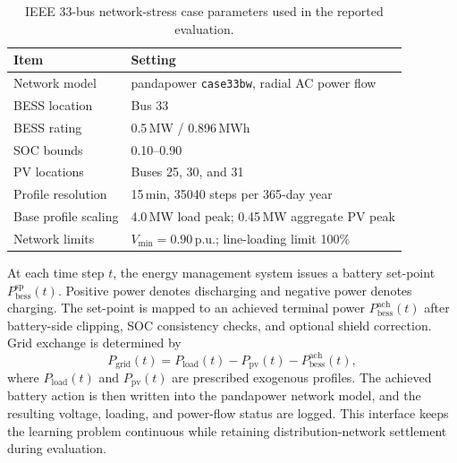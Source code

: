 \begin{table}[!t]
\centering
\footnotesize
\setlength{\tabcolsep}{4pt}
\renewcommand{\arraystretch}{1.08}
\caption{IEEE 33-bus network-stress case parameters used in the reported evaluation.}
\label{tab:ieee33_case_parameters}
\begin{tabularx}{\columnwidth}{lX}
\toprule
Item & Setting \\
\midrule
Network model & pandapower \texttt{case33bw}, radial AC power flow \\
BESS location & Bus 33 \\
BESS rating & 0.5\,MW / 0.896\,MWh \\
SOC bounds & 0.10--0.90 \\
PV locations & Buses 25, 30, and 31 \\
Profile resolution & 15\,min, 35040 steps per 365-day year \\
Base profile scaling & 4.0\,MW load peak; 0.45\,MW aggregate PV peak \\
Network limits & $V_{\min}=0.90$\,p.u.; line-loading limit 100\% \\
\bottomrule
\end{tabularx}
\end{table}

At each time step $t$, the energy management system issues a battery set-point $P_{\mathrm{bess}}^{\mathrm{sp}}(t)$. Positive power denotes discharging and negative power denotes charging. The set-point is mapped to an achieved terminal power $P_{\mathrm{bess}}^{\mathrm{ach}}(t)$ after battery-side clipping, SOC consistency checks, and optional shield correction. Grid exchange is determined by
\begin{equation}
P_{\mathrm{grid}}(t)=P_{\mathrm{load}}(t)-P_{\mathrm{pv}}(t)-P_{\mathrm{bess}}^{\mathrm{ach}}(t),
\label{eq:grid_balance_morphology}
\end{equation}
where $P_{\mathrm{load}}(t)$ and $P_{\mathrm{pv}}(t)$ are prescribed exogenous profiles. The achieved battery action is then written into the pandapower network model, and the resulting voltage, loading, and power-flow status are logged. This interface keeps the learning problem continuous while retaining distribution-network settlement during evaluation.

